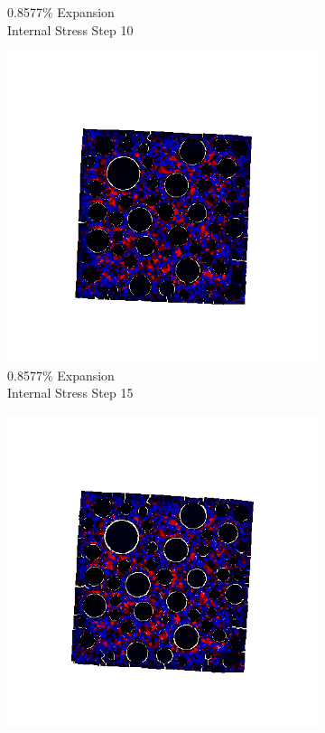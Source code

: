 \begin{figure}[ht!]
\begin{subfigure}{.25\textwidth}
      \caption{0.8577\% Expansion\\Internal Stress Step 10}
    \end{subfigure}%
    \begin{subfigure}{.25\textwidth}
      \centering
      \includegraphics[width=1.0\linewidth]{Files/exp_3D/DEF/A30X-5C_4_s15.png}
      \caption{0.8577\% Expansion\\Internal Stress Step 15}
    \end{subfigure}%
    \begin{subfigure}{.25\textwidth}
      \centering
      \includegraphics[width=1.0\linewidth]{Files/exp_3D/DEF/A30X-5C_4_stress.png}

\end{subfigure}
\end{figure}
